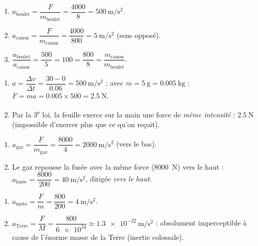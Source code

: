\documentclass[11pt,a4paper]{article}
\begin{document}

\begin{corrige}
\begin{enumerate}[label=\alph*)]
  \item $a_{\text{boulet}}=\dfrac{F}{m_{\text{boulet}}}=\dfrac{4000}{8}=\qty{500}{\metre\per\second\squared}$.
  \item $a_{\text{canon}}=\dfrac{F}{m_{\text{canon}}}=\dfrac{4000}{800}=\qty{5}{\metre\per\second\squared}$ (sens opposé).
  \item $\dfrac{a_{\text{boulet}}}{a_{\text{canon}}}=\dfrac{500}{5}=100=\dfrac{800}{8}=\dfrac{m_{\text{canon}}}{m_{\text{boulet}}}$. \checkmark
\end{enumerate}
\end{corrige}

\begin{corrige}
\begin{enumerate}[label=\alph*)]
  \item $a=\dfrac{\Delta v}{\Delta t}=\dfrac{30-0}{\num{0,06}}=\qty{500}{\metre\per\second\squared}$ ; avec
        $m=\qty{5}{\gram}=\qty{0,005}{\kilogram}$ : $F=ma=\num{0,005}\times500=\qty{2,5}{\newton}$.
  \item Par la 3\textsuperscript{e} loi, la feuille exerce sur la main une force de \emph{même intensité} :
        $\qty{2,5}{\newton}$ (impossible d'exercer plus que ce qu'on reçoit).
\end{enumerate}
\end{corrige}

\begin{corrige}
\begin{enumerate}[label=\alph*)]
  \item $a_{\text{gaz}}=\dfrac{F}{m_{\text{gaz}}}=\dfrac{8000}{4}=\qty{2000}{\metre\per\second\squared}$ (vers le bas).
  \item Le gaz repousse la fusée avec la même force (\qty{8000}{\newton}) vers le haut :
        $a_{\text{fusée}}=\dfrac{8000}{200}=\qty{40}{\metre\per\second\squared}$, dirigée \emph{vers le haut}.
\end{enumerate}
\end{corrige}

\begin{corrige}
\begin{enumerate}[label=\alph*)]
  \item $a_{\text{moto}}=\dfrac{F}{m}=\dfrac{800}{200}=\qty{4}{\metre\per\second\squared}$.
  \item $a_{\text{Terre}}=\dfrac{F}{M}=\dfrac{800}{\num{6e24}}\approx\qty{1,3e-22}{\metre\per\second\squared}$ :
        absolument imperceptible à cause de l'énorme masse de la Terre (inertie colossale).
\end{enumerate}
\end{corrige}
\end{document}
